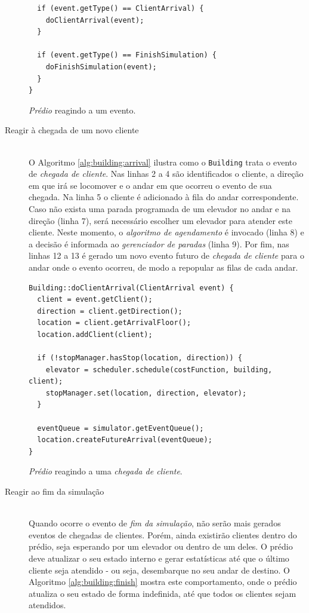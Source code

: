 \begin{description}
\begin{algorithm}[htb!]
\begin{verbatim}
  if (event.getType() == ClientArrival) {
    doClientArrival(event);
  }

  if (event.getType() == FinishSimulation) {
    doFinishSimulation(event);
  }
}
        \end{verbatim}
      \caption{\textit{Prédio} reagindo a um evento.}
      \label{alg:building:notify}
    \end{algorithm}

  \item[Reagir à chegada de um novo cliente] \hfill \\
    O Algoritmo \ref{alg:building:arrival} ilustra como o \texttt{Building}
    trata o evento de \textit{chegada de cliente}. Nas linhas 2 a 4 são
    identificados o cliente, a direção em que irá se locomover e o andar em que
    ocorreu o evento de sua chegada. Na linha 5 o cliente é adicionado à fila do
    andar correspondente. Caso não exista uma parada programada de um elevador
    no andar e na direção (linha 7), será necessário escolher um elevador para
    atender este cliente. Neste momento, o \textit{algoritmo de agendamento} é
    invocado (linha 8) e a decisão é informada ao \textit{gerenciador de
    paradas} (linha 9). Por fim, nas linhas 12 a 13 é gerado um novo evento
    futuro de \textit{chegada de cliente} para o andar onde o evento ocorreu, de
    modo a repopular as filas de cada andar.

    \begin{algorithm}[htb!]
      \centering
        \begin{verbatim}
Building::doClientArrival(ClientArrival event) {
  client = event.getClient();
  direction = client.getDirection();
  location = client.getArrivalFloor();
  location.addClient(client);

  if (!stopManager.hasStop(location, direction)) {
    elevator = scheduler.schedule(costFunction, building, client);
    stopManager.set(location, direction, elevator);
  }

  eventQueue = simulator.getEventQueue();
  location.createFutureArrival(eventQueue);
}
        \end{verbatim}
      \caption{\textit{Prédio} reagindo a uma \textit{chegada de cliente}.}
      \label{alg:building:arrival}
    \end{algorithm}

  \item[Reagir ao fim da simulação] \hfill \\
    Quando ocorre o evento de \textit{fim da simulação}, não serão mais gerados
    eventos de chegadas de clientes. Porém, ainda existirão clientes dentro do
    prédio, seja esperando por um elevador ou dentro de um deles. O prédio deve
    atualizar o seu estado interno e gerar estatísticas até que o último cliente
    seja atendido - ou seja, desembarque no seu andar de destino. O Algoritmo
    \ref{alg:building:finish} mostra este comportamento, onde o prédio atualiza
    o seu estado de forma indefinida, até que todos os clientes sejam atendidos.


\end{description}
